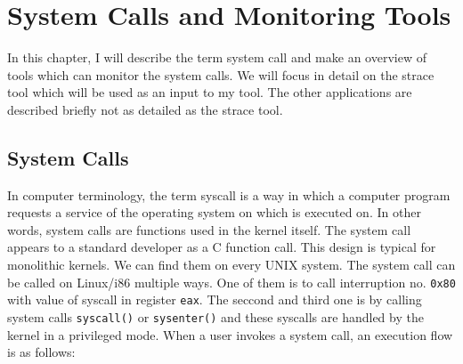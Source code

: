 \chapter{System Calls and Monitoring Tools}
\label{chap:syscalls}
In this chapter, I will describe the term system call and make an overview of tools which can monitor the system calls.
We will focus in detail on the strace tool which will be used as an input to my tool.
The other applications are described briefly not as detailed as the strace tool.

\section{System Calls}

In computer terminology, the term syscall is a way in which a computer program requests a service of the operating system on which is executed on.
In other words, system calls are functions used in the kernel itself.
The system call appears to a standard developer as a C function call.
This design is typical for monolithic kernels.
We can find them on every UNIX system.
The system call can be called on Linux/i86 multiple ways. One of them is to call interruption no. \texttt{0x80} with value of syscall in register \texttt{eax}.
The seccond and third one is by calling system calls \texttt{syscall()} or \texttt{sysenter()} and these syscalls are handled by the kernel in a privileged mode.
When a user invokes a system call, an execution flow is as follows:
